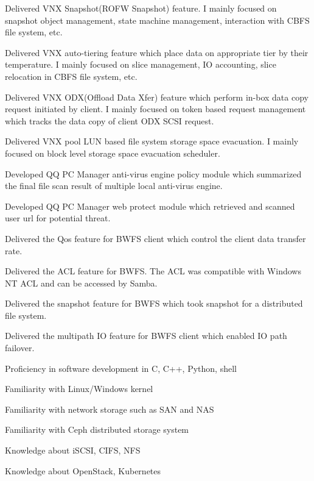 \documentclass{CurriculumVitae} %
\begin{document}
\begin{achievements}
\item Delivered VNX Snapshot(ROFW Snapshot) feature. I mainly focused on snapshot object management, state machine management, interaction with CBFS file system, etc.
\item Delivered VNX auto-tiering feature which place data on appropriate tier by their temperature. I mainly focused on slice management, IO accounting, slice relocation in CBFS file system, etc.
\item Delivered VNX ODX(Offload Data Xfer) feature which perform in-box data copy request initiated by client. I mainly focused on token based request management which tracks the data copy of client ODX SCSI request.
\item Delivered VNX pool LUN based file system storage space evacuation. I mainly focused on block level storage space evacuation scheduler.
\end{achievements}

\begin{achievements}
\item Developed QQ PC Manager anti-virus engine policy module which summarized the final file scan result of multiple local anti-virus engine.
\item Developed QQ PC Manager web protect module which retrieved and scanned user url for potential threat.
\end{achievements}

\begin{achievements}
\item Delivered the Qos feature for BWFS client which control the client data transfer rate.
\item Delivered the ACL feature for BWFS. The ACL was compatible with Windows NT ACL and can be accessed by Samba.
\item Delivered the snapshot feature for BWFS which took snapshot for a distributed file system.
\item Delivered the multipath IO feature for BWFS client which enabled IO path failover.
\end{achievements}

\begin{achievements}
\item Proficiency in software development in C, C++, Python, shell
\item Familiarity with Linux/Windows kernel
\item Familiarity with network storage such as SAN and NAS
\item Familiarity with Ceph distributed storage system
\item Knowledge about iSCSI, CIFS, NFS
\item Knowledge about OpenStack, Kubernetes
\end{achievements}
\end{document}
